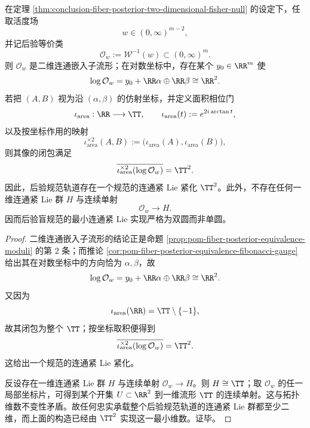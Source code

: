 \begin{corollary}\label{cor:conclusion-fiber-posterior-gauge-two-torus}
在定理 \ref{thm:conclusion-fiber-posterior-two-dimensional-fisher-null} 的设定下，任取活度场
\[
w\in(0,\infty)^{m-2},
\]
并记后验等价类
\[
\mathcal O_w:=\mathcal W^{-1}(w)\subset(0,\infty)^m.
\]
则 \(\mathcal O_w\) 是二维连通嵌入子流形；在对数坐标中，存在某个 \(y_0\in\RR^m\) 使
\[
\log\mathcal O_w
=
y_0+\RR\alpha\oplus \RR\beta
\cong \RR^2.
\]
若把 \((A,B)\) 视为沿 \((\alpha,\beta)\) 的仿射坐标，并定义面积相位门
\[
\iota_{\mathrm{area}}:\RR\longrightarrow \TT,
\qquad
\iota_{\mathrm{area}}(t):=e^{2i\arctan t},
\]
以及按坐标作用的映射
\[
\iota_{\mathrm{area}}^{\times 2}(A,B)
:=
\bigl(\iota_{\mathrm{area}}(A),\iota_{\mathrm{area}}(B)\bigr),
\]
则其像的闭包满足
\[
\overline{\iota_{\mathrm{area}}^{\times 2}(\log\mathcal O_w)}=\TT^2.
\]
因此，后验规范轨道存在一个规范的连通紧 Lie 紧化 \(\TT^2\)。此外，不存在任何一维连通紧 Lie 群 \(H\) 与连续单射
\[
\mathcal O_w\longrightarrow H.
\]
因而后验盲规范的最小连通紧 Lie 实现严格为双圆而非单圆。
\end{corollary}
\begin{proof}
二维连通嵌入子流形的结论正是命题 \ref{prop:pom-fiber-posterior-equivalence-moduli} 的第 \(2\) 条；而推论 \ref{cor:pom-fiber-posterior-equivalence-fibonacci-gauge} 给出其在对数坐标中的方向恰为 \(\alpha,\beta\)，故
\[
\log\mathcal O_w=y_0+\RR\alpha\oplus \RR\beta\cong\RR^2.
\]
又因为
\[
\iota_{\mathrm{area}}(\RR)=\TT\setminus\{-1\},
\]
故其闭包为整个 \(\TT\)；按坐标取积便得到
\[
\overline{\iota_{\mathrm{area}}^{\times 2}(\log\mathcal O_w)}=\TT^2.
\]
这给出一个规范的连通紧 Lie 紧化。

反设存在一维连通紧 Lie 群 \(H\) 与连续单射 \(\mathcal O_w\to H\)。则 \(H\cong \TT\)；取 \(\mathcal O_w\) 的任一局部坐标片，可得到某个开集 \(U\subset\RR^2\) 到一维流形 \(\TT\) 的连续单射。这与拓扑维数不变性矛盾。故任何忠实承载整个后验规范轨道的连通紧 Lie 群都至少二维，而上面的构造已经由 \(\TT^2\) 实现这一最小维数。证毕。
\end{proof}

